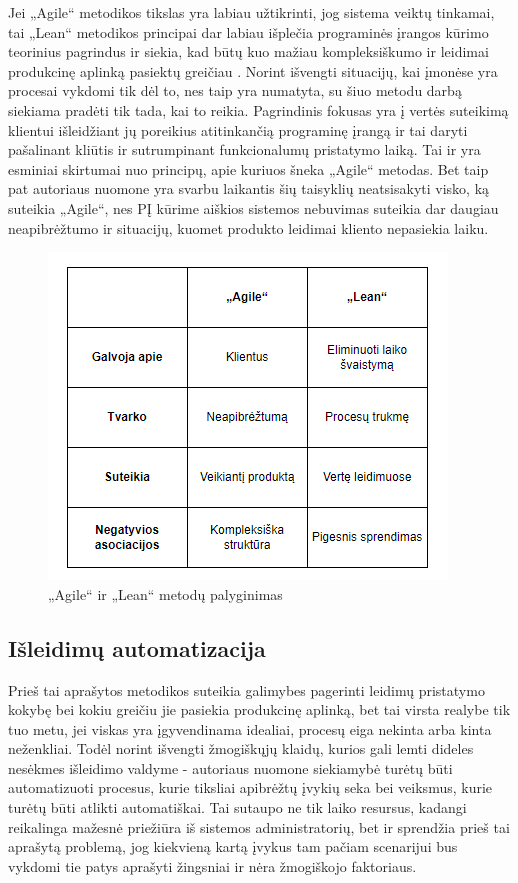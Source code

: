 \documentclass{VUMIFPSkursinis}
\begin{document}
Jei „Agile“ metodikos tikslas yra labiau užtikrinti, jog sistema veiktų tinkamai, tai „Lean“ metodikos principai dar labiau išplečia programinės įrangos kūrimo teorinius pagrindus ir siekia, kad būtų kuo mažiau kompleksiškumo ir leidimai produkcinę aplinką pasiektų greičiau \cite{SaltSestas}. Norint išvengti situacijų, kai įmonėse yra procesai vykdomi tik dėl to, nes taip yra numatyta, su šiuo metodu darbą siekiama pradėti tik tada, kai to reikia. Pagrindinis fokusas yra į vertės suteikimą klientui išleidžiant jų poreikius atitinkančią programinę įrangą ir tai daryti pašalinant kliūtis ir sutrumpinant funkcionalumų pristatymo laiką. Tai ir yra esminiai skirtumai nuo principų, apie kuriuos šneka „Agile“ metodas. Bet taip pat autoriaus nuomone yra svarbu laikantis šių taisyklių neatsisakyti visko, ką suteikia „Agile“, nes PĮ kūrime aiškios sistemos nebuvimas suteikia dar daugiau neapibrėžtumo ir situacijų, kuomet produkto leidimai kliento nepasiekia laiku.

\begin{figure}[H]
    \centering
    \includegraphics[scale=0.8]{img/AgileVSLean.png}
    \caption{„Agile“ ir „Lean“ metodų palyginimas}
    \label{img:mlp}
\end{figure}

\subsection{Išleidimų automatizacija}

Prieš tai aprašytos metodikos suteikia galimybes pagerinti leidimų pristatymo kokybę bei kokiu greičiu jie pasiekia produkcinę aplinką, bet tai virsta realybe tik tuo metu, jei viskas yra įgyvendinama idealiai, procesų eiga nekinta arba kinta neženkliai. Todėl norint išvengti žmogiškųjų klaidų, kurios gali lemti dideles nesėkmes išleidimo valdyme - autoriaus nuomone siekiamybė turėtų būti automatizuoti procesus, kurie tiksliai apibrėžtų įvykių seka bei veiksmus, kurie turėtų būti atlikti automatiškai. Tai sutaupo ne tik laiko resursus, kadangi reikalinga mažesnė priežiūra iš sistemos administratorių, bet ir sprendžia prieš tai aprašytą problemą, jog kiekvieną kartą įvykus tam pačiam scenarijui bus vykdomi tie patys aprašyti žingsniai ir nėra žmogiškojo faktoriaus.
\end{document}
